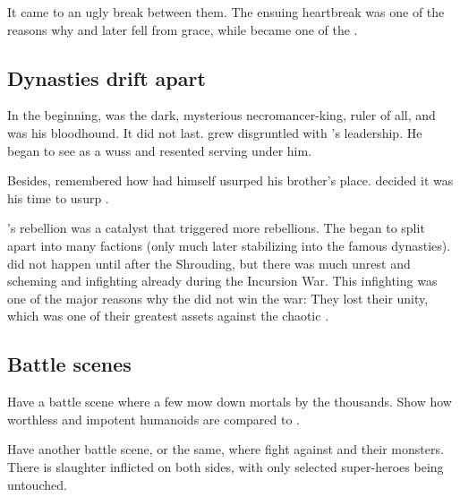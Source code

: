It came to an ugly break between them. 
The ensuing heartbreak was one of the reasons why \Shiaraid{} and \Mystraacht{} later fell from grace, while \Eryal{} became one of the . 









\subsection{Dynasties drift apart}
In the beginning, \Azraid was the dark, mysterious necromancer-king, ruler of all, and \Zachirah was his bloodhound. 
It did not last.
\Zachirah grew disgruntled with \Azraid's leadership. 
He began to see \Azraid as a wuss and resented serving under him. 

Besides, \Zachirah remembered how \Azraid had himself usurped his brother's place.
\Zachirah decided it was his time to usurp \Azraid. 

\Zachirah's rebellion was a catalyst that triggered more rebellions.
The \resphain began to split apart into many factions (only much later stabilizing into the famous dynasties). 
 did not happen until after the Shrouding, but there was much unrest and scheming and infighting already during the Incursion War. 
This infighting was one of the major reasons why the \resphain did not win the war: 
They lost their unity, which was one of their greatest assets against the chaotic \dragonlords. 









\subsection{Battle scenes}
Have a battle scene where a few \dragons{} mow down mortals by the thousands. 
Show how worthless and impotent humanoids are compared to \dragons.


Have another battle scene, or the same, where \dragons{} fight against \banes{} and their monsters. There is slaughter inflicted on both sides, with only selected super-heroes being untouched. 

